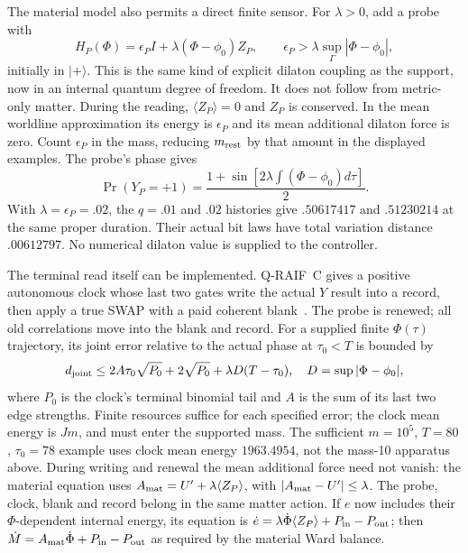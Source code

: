 The material model also permits a direct finite sensor. For $\lambda>0$, add a probe with
\begin{equation}\label{eq:material-probe}
 H_P(\Phi)=\epsilon_P I+\lambda(\Phi-\phi_0)Z_P,
 \qquad \epsilon_P>\lambda\sup_\Gamma|\Phi-\phi_0|,
\end{equation}
initially in $|+\rangle$. This is the same kind of explicit dilaton
coupling as the support, now in an internal quantum degree of freedom.
It does not follow from metric-only matter.
During the reading, $\langle Z_P\rangle=0$ and $Z_P$ is conserved.
In the mean worldline approximation its energy is $\epsilon_P$ and its
mean additional dilaton force is zero. Count $\epsilon_P$ in the mass,
reducing $m_{\rm rest}$ by that amount in the displayed examples.
The probe's phase gives
\begin{equation}\label{eq:material-probe-record}
 \Pr(Y_P=+1)=\frac{1+\sin[2\lambda\int(\Phi-\phi_0)d\tau]}2.
\end{equation}
With $\lambda=\epsilon_P=.02$, the $q=.01$ and $.02$ histories give
$.50617417$ and $.51230214$ at the same proper duration.
Their actual bit laws have total variation distance $.00612797$.
No numerical dilaton value is supplied to the controller.

The terminal read itself can be implemented. Q-RAIF~C gives a positive
autonomous clock whose last two gates write the actual $Y$ result into
a record, then apply a true SWAP with a paid coherent blank~\cite{QRC}.
The probe is renewed; all old correlations move into the blank and
record. For a supplied finite $\Phi(\tau)$ trajectory, its joint error
relative to the actual phase at $\tau_0<T$ is bounded by
\begin{equation}\label{eq:material-terminal-read}
 d_{\rm joint}\le2A\tau_0\sqrt{P_0}+2\sqrt{P_0}
                    +\lambda D(T-\tau_0),\quad
 D=\sup|\Phi-\phi_0|,
\end{equation}
where $P_0$ is the clock's terminal binomial tail and $A$ is the sum
of its last two edge strengths. Finite resources suffice for each
specified error; the clock mean energy is $Jm$, and must enter the
supported mass. The sufficient $m=10^5$, $T=80$, $\tau_0=78$ example
uses clock mean energy $1963.4954$, not the mass-10 apparatus above.
During writing and renewal the mean additional force need not vanish:
the material equation uses $A_{\rm mat}=U'+\lambda\langle Z_P\rangle$,
with $|A_{\rm mat}-U'|\le\lambda$. The probe, clock, blank and record
belong in the same matter action. If $e$ now includes their
$\Phi$-dependent internal energy, its equation is
$\dot e=\lambda\dot\Phi\langle Z_P\rangle+P_{\rm in}-P_{\rm out}$;
then $\dot M=A_{\rm mat}\dot\Phi+P_{\rm in}-P_{\rm out}$ as required
by the material Ward balance.

